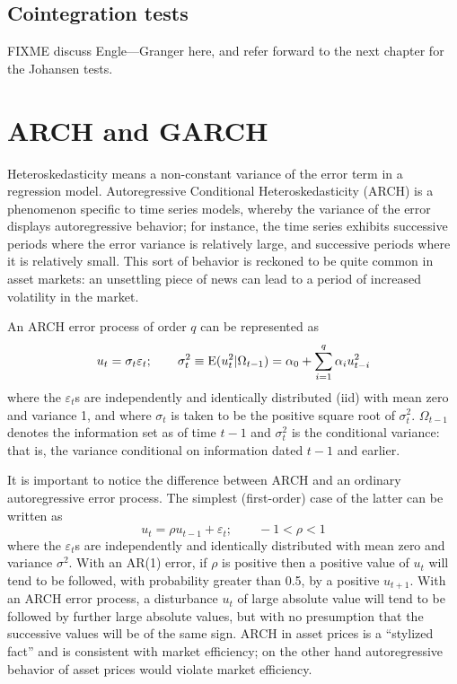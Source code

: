 \subsection{Cointegration tests}
\label{sec:coint-test}

FIXME discuss Engle---Granger here, and refer forward to
the next chapter for the Johansen tests.


\section{ARCH and GARCH}
\label{sec:arch-garch}

Heteroskedasticity means a non-constant variance of the error term in
a regression model.  Autoregressive Conditional Heteroskedasticity
(ARCH) is a phenomenon specific to time series models, whereby the
variance of the error displays autoregressive behavior; for instance,
the time series exhibits successive periods where the error variance
is relatively large, and successive periods where it is relatively
small.  This sort of behavior is reckoned to be quite common in asset
markets: an unsettling piece of news can lead to a period of increased
volatility in the market.

An ARCH error process of order $q$ can be represented as
\[
u_t = \sigma_t \varepsilon_t; \qquad
\sigma^2_t \equiv {\rm E}(u^2_t|\Omega_{t-1}) = 
\alpha_0 + \sum_{i=1}^q \alpha_i u^2_{t-i}
\]
where the $\varepsilon_t$s are independently and identically
distributed (iid) with mean zero and variance 1, and where $\sigma_t$
is taken to be the positive square root of $\sigma^2_t$.
$\Omega_{t-1}$ denotes the information set as of time $t-1$ and
$\sigma^2_t$ is the conditional variance: that is, the
variance conditional on information dated $t-1$ and earlier.

It is important to notice the difference between ARCH and an ordinary
autoregressive error process.  The simplest (first-order) case of the
latter can be written as
\[
u_t = \rho u_{t-1} + \varepsilon_t; \qquad -1 < \rho < 1
\]
where the $\varepsilon_t$s are independently and identically
distributed with mean zero and variance $\sigma^2$.  With an
AR(1) error, if $\rho$ is positive then a positive value of $u_t$ will
tend to be followed, with probability greater than 0.5, by a positive
$u_{t+1}$.  With an ARCH error process, a disturbance $u_t$ of large
absolute value will tend to be followed by further large absolute
values, but with no presumption that the successive values will be of
the same sign.  ARCH in asset prices is a ``stylized fact'' and is
consistent with market efficiency; on the other hand autoregressive
behavior of asset prices would violate market efficiency.

